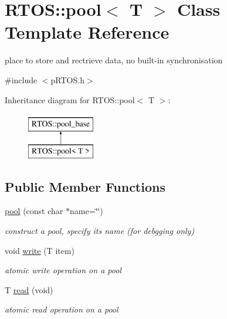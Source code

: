 \hypertarget{class_r_t_o_s_1_1pool}{}\section{R\+T\+OS\+:\+:pool$<$ T $>$ Class Template Reference}
\label{class_r_t_o_s_1_1pool}


place to store and rectrieve data, no built-\/in synchronisation  




{\ttfamily \#include $<$p\+R\+T\+O\+S.\+h$>$}

Inheritance diagram for R\+T\+OS\+:\+:pool$<$ T $>$\+:\begin{figure}[H]
\begin{center}
\leavevmode
\includegraphics[height=2.000000cm]{class_r_t_o_s_1_1pool}
\end{center}
\end{figure}
\subsection*{Public Member Functions}
\begin{DoxyCompactItemize}
\item 
\hyperlink{class_r_t_o_s_1_1pool_a34dfd08a46f1fd274f1692469eebaf36}{pool} (const char $\ast$name=\char`\"{}\char`\"{})
\begin{DoxyCompactList}\small\item\em construct a pool, specify its name (for debgging only) \end{DoxyCompactList}\item 
void \hyperlink{class_r_t_o_s_1_1pool_a2bd2a2bfb99d74c8b123de344698ff53}{write} (T item)
\begin{DoxyCompactList}\small\item\em atomic write operation on a pool \end{DoxyCompactList}\item 
T \hyperlink{class_r_t_o_s_1_1pool_a0ef6382b71ae141cf38f477c8bfea325}{read} (void)
\begin{DoxyCompactList}\small\item\em atomic read operation on a pool \end{DoxyCompactList}\end{DoxyCompactItemize}
